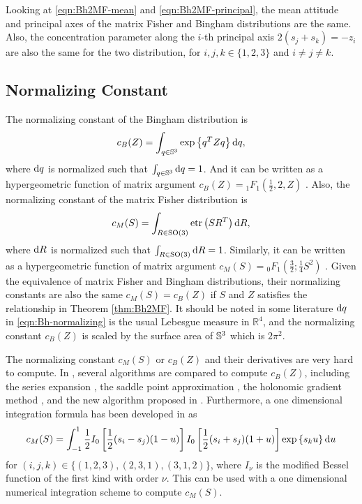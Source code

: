 Looking at \eqref{eqn:Bh2MF-mean} and \eqref{eqn:Bh2MF-principal}, the mean attitude and principal axes of the matrix Fisher and Bingham distributions are the same.
Also, the concentration parameter along the $i$-th principal axis $2(s_j+s_k) = -z_i$ are also the same for the two distribution, for $i,j,k\in\{1,2,3\}$ and $i\neq j\neq k$.

\subsection{Normalizing Constant}

The normalizing constant of the Bingham distribution is
\begin{align} \label{eqn:Bh-normalizing}
	c_B(Z) = \int_{q\in\mathbb{S}^3} \exp\left\{ q^TZq \right\} \mathrm{d} q,
\end{align}
where $\mathrm{d} q$ is normalized such that $\int_{q\in\mathbb{S}^3} \mathrm{d} q = 1$.
And it can be written as a hypergeometric function of
matrix argument $c_B(Z) = {}_1F_1(\frac{1}{2},2,Z)$ \cite{bingham1974antipodally}.
Also, the normalizing constant of the matrix Fisher distribution is
\begin{align} \label{eqn:MF-normalizing}
	c_M(S) = \int_{R\in\mathrm{SO}(3)} \mathrm{etr}\left( SR^T \right) \mathrm{d} R,
\end{align}
where $\mathrm{d} R$ is normalized such that $\int_{R\in\mathrm{SO}(3)}\mathrm{d} R = 1$.
Similarly, it can be written as a hypergeometric function of
matrix argument $c_M(S) = {}_0F_1(\tfrac{3}{2};\tfrac{1}{4}S^2)$ \cite{khatri1977mises}.
Given the equivalence of matrix Fisher and Bingham distributions, their normalizing constants are also the same $c_M(S) = c_B(Z)$ \cite{lee2018bayesian} if $S$ and $Z$ satisfies the relationship in Theorem \ref{thm:Bh2MF}.
It should be noted in some literature $\mathrm{d} q$ in \eqref{eqn:Bh-normalizing} is the usual Lebesgue measure in $\mathbb{R}^4$, and the normalizing constant $c_B(Z)$ is scaled by the surface area of $\mathbb{S}^3$ which is $2\pi^2$.

The normalizing constant $c_M(S)$ or $c_B(Z)$ and their derivatives are very hard to compute.
In \cite{gilitschenski2014efficient}, several algorithms are compared to compute $c_B(Z)$, including the series expansion \cite{koev2006efficient}, the saddle point approximation \cite{kume2005saddlepoint}, the holonomic gradient method \cite{sei2015calculating}, and the new algorithm proposed in \cite{koev2006efficient}.
Furthermore, a one dimensional integration formula has been developed in \cite{lee2018bayesian,wood1993estimation} as
\begin{align} \label{eqn:MF-normalizing-1dInt}
	c_M(S) = \int_{-1}^1 \frac{1}{2} I_0\left[ \frac{1}{2}(s_i-s_j)(1-u) \right] I_0\left[ \frac{1}{2}(s_i+s_j)(1+u) \right] \exp\left\{ s_ku \right\} \mathrm{d} u
\end{align}
for $(i,j,k) \in \{(1,2,3),(2,3,1),(3,1,2)\}$, where $I_\nu$ is the modified Bessel function of the first kind with order $\nu$.
This can be used with a one dimensional numerical integration scheme to compute $c_M(S)$.

